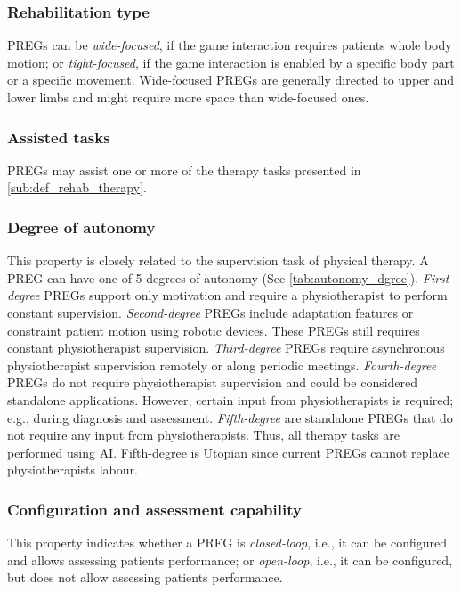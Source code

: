 \subsubsection{Rehabilitation type}
\acp{PREG} can be \textit{wide-focused}, if the game interaction requires patients whole body motion; or \textit{tight-focused}, if the game interaction is enabled by a specific body part or a specific movement. Wide-focused \acp{PREG} are generally directed to upper and lower limbs and might require more space than wide-focused ones.
    
\subsubsection{Assisted tasks}
\acp{PREG} may assist one or more of the therapy tasks presented in \autoref{sub:def_rehab_therapy}.
    
\subsubsection{Degree of autonomy}
This property is closely related to the supervision task of physical therapy. A \ac{PREG} can have one of 5 degrees of autonomy (See \autoref{tab:autonomy_dgree}). \textit{First-degree} \acp{PREG} support only motivation and require a physiotherapist to perform constant supervision. \textit{Second-degree} \acp{PREG} include adaptation features or constraint patient motion using robotic devices. These \acp{PREG} still requires constant physiotherapist supervision. \textit{Third-degree} \acp{PREG} require asynchronous physiotherapist supervision remotely or along periodic meetings. \textit{Fourth-degree} \acp{PREG} do not require physiotherapist supervision and could be considered standalone applications. However, certain input from physiotherapists is required; e.g., during diagnosis and assessment. \textit{Fifth-degree} are standalone \acp{PREG} that do not require any input from physiotherapists. Thus, all therapy tasks are performed using \ac{AI}. Fifth-degree is Utopian since current \acp{PREG} cannot replace physiotherapists labour.
    
\subsubsection{Configuration and assessment capability}
This property indicates whether a \ac{PREG} is \textit{closed-loop}, i.e., it can be configured and allows assessing patients performance; or \textit{open-loop}, i.e., it can be configured, but does not allow assessing patients performance.
    
